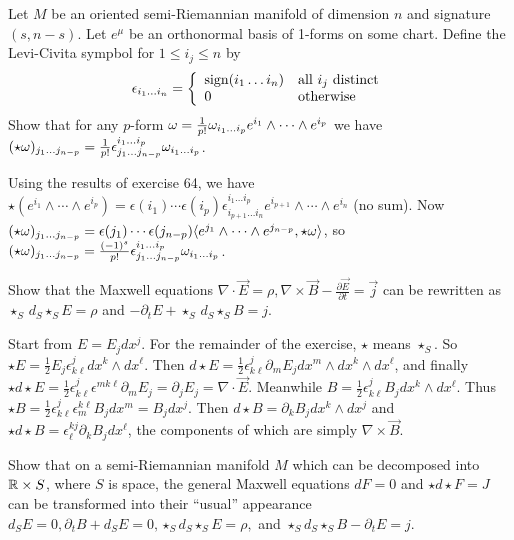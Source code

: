 \begin{p}{Let $M$ be an oriented semi-Riemannian manifold of dimension $n$ and signature $(s,n{-}s)$. 
Let $e^\mu$ be an orthonormal basis of 1-forms on some chart. Define the 
Levi-Civita sympbol for $1\leq i_j\leq n$ by 
\[ \epsilon_{i_1\dots i_n}=\left\{
\begin{array}{ll}
{\rm sign}(i_1\dots i_n) & \textrm{all $i_j$ distinct}\\0 &{\rm otherwise}
\end{array}
\right. \]}
Show that for any $p$-form $\omega=\frac{1}{p!}\omega_{i_1\dots i_p}e^{i_1}\wedge\dots\wedge e^{i_p}$ we
have $(\star\omega)_{j_1\dots j_{n{-}p}}=\frac{1}{p!}\epsilon^{i_1\dots i_p}_{j_1\dots j_{n{-}p}}\omega_{i_1\dots i_p}$.
\end{p}

Using the results of exercise 64, we have $\star(e^{i_1}\wedge \cdots \wedge
e^{i_p})=\epsilon(i_1)\cdots \epsilon(i_p)\epsilon^{i_1\dots i_p}_{i_{p+1}\dots i_{n}}e^{i_{p+1}}\wedge \cdots \wedge e^{i_n}$ 
(no sum). Now $(\star\omega)_{j_1\dots j_{n{-}p}}=\epsilon(j_1)\cdots \epsilon(j_{n{-}p})\langle e^{j_1}\wedge\dots \wedge e^{j_{n{-}p}},\star \omega\rangle$, so $(\star\omega)_{j_1\dots j_{n{-}p}}=\frac{(-1)^s}{p!}\epsilon^{i_1\dots i_p}_{j_1\dots j_{n{-}p}}\omega_{i_1\dots i_p}$. 

\begin{p} {Show that the Maxwell equations $\nabla\cdot \vec{E}=\rho, \nabla\times \vec{B}-\frac{\partial \vec{E}}{\partial t}=\vec{j}$ can be rewritten as $\star_S\, d_S \star_S\! E=\rho$ and $-\partial_t E+\star_S \,d_S\star_S\! B=j$.}
\end{p}

Start from $E=E_j dx^j$. For the remainder of the exercise, $\star$ means $\star_S$. So $\star E=\frac{1}{2}E_j \epsilon^{j}_{k\ell}dx^k\wedge dx^\ell$. Then $d\star\!E=\frac{1}{2}\epsilon^j_{k\ell}\partial_m E_j dx^m\wedge dx^k\wedge dx^\ell$, and finally $\star d\star\! E=\frac{1}{2}\epsilon^{j}_{k\ell}\epsilon^{mk\ell}\partial_m E_j=\partial_j E_j=\nabla\cdot\vec{E}$. Meanwhile $B=\frac{1}{2}\epsilon^j_{k\ell} B_j dx^k\wedge dx^\ell$. Thus $\star B=\frac{1}{2}\epsilon^j_{k\ell}\epsilon^{k\ell}_m B_j dx^m=B_j dx^j$. Then $d\star\!B=\partial_k B_j dx^k\wedge dx^j$
and $\star d\star\!B=\epsilon^{kj}_\ell \partial_k B_j dx^\ell$, the components of which are simply
$\nabla\times \vec{B}$.\\

\begin{p}
{Show that on a  semi-Riemannian manifold $M$ which can
be decomposed into $\mathbb{R}\times S$, where $S$ is space, the general Maxwell 
equations $dF=0$ and $\star d\star F=J$ can be transformed into their ``usual'' 
appearance $d_S E=0, \partial_t B+d_SE=0, \star_Sd_S\star_SE=\rho,$ and
$\star_Sd_S\star_SB-\partial_tE=j$.}
\end{p}

